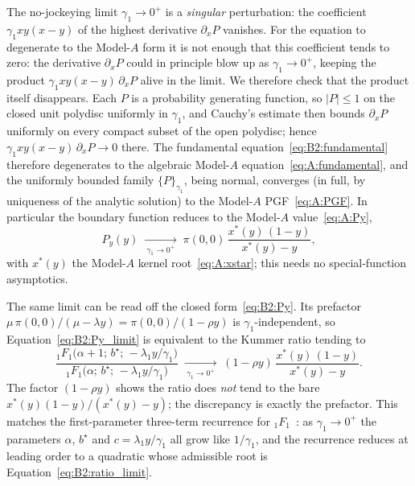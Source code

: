 \begin{remark}\label{rem:B2:singular_limit}
The no-jockeying limit $\gamma_1\to0^{+}$ is a \emph{singular} perturbation: the coefficient
$\gamma_1 xy(x-y)$ of the highest derivative $\partial_x P$ vanishes. For the equation to
degenerate to the Model-$A$ form it is not enough that this coefficient tends to zero: the
derivative $\partial_x P$ could in principle blow up as $\gamma_1\to0^{+}$, keeping the
product $\gamma_1 xy(x-y)\,\partial_x P$ alive in the limit. We therefore check that the
product itself disappears. Each $P$ is a
probability generating function, so $|P|\le1$ on the closed unit polydisc uniformly in
$\gamma_1$, and Cauchy's estimate then bounds $\partial_x P$ uniformly on every compact subset
of the open polydisc; hence $\gamma_1 xy(x-y)\,\partial_x P\to0$ there. The fundamental
equation~\eqref{eq:B2:fundamental} therefore degenerates to the algebraic Model-$A$
equation~\eqref{eq:A:fundamental}, and the uniformly bounded family $\{P\}_{\gamma_1}$, being
normal, converges (in full, by uniqueness of the analytic solution) to the Model-$A$
PGF~\eqref{eq:A:PGF}. In particular the boundary function reduces to the Model-$A$
value~\eqref{eq:A:Py},
\begin{equation}
    P_y(y)\;\xrightarrow[\ \gamma_1\to0^{+}\ ]{}\;
    \pi(0,0)\,\frac{x^*(y)\,(1-y)}{x^*(y)-y},
    \label{eq:B2:Py_limit}
\end{equation}
with $x^*(y)$ the Model-$A$ kernel root~\eqref{eq:A:xstar}; this needs no special-function
asymptotics.

The same limit can be read off the closed form~\eqref{eq:B2:Py}. Its prefactor
$\mu\,\pi(0,0)/(\mu-\lambda y)=\pi(0,0)/(1-\rho y)$ is $\gamma_1$-independent,
so Equation~\eqref{eq:B2:Py_limit} is equivalent to the Kummer ratio tending to
\begin{equation}
    \frac{{}_1F_1\!\bigl(\alpha+1;\,b^\star;\,-\lambda_1 y/\gamma_1\bigr)}
         {{}_1F_1\!\bigl(\alpha;\,b^\star;\,-\lambda_1 y/\gamma_1\bigr)}
    \;\xrightarrow[\ \gamma_1\to0^{+}\ ]{}\;
    (1-\rho y)\,\frac{x^*(y)\,(1-y)}{x^*(y)-y}.
    \label{eq:B2:ratio_limit}
\end{equation}
The factor $(1-\rho y)$ shows the ratio does \emph{not} tend to the bare
$x^*(y)(1-y)/(x^*(y)-y)$; the discrepancy is exactly the prefactor. This matches the
first-parameter three-term recurrence for ${}_1F_1$~\cite[\S13.3]{dlmf}: as $\gamma_1\to0^{+}$
the parameters $\alpha$, $b^\star$ and $c=\lambda_1 y/\gamma_1$ all grow like $1/\gamma_1$, and
the recurrence reduces at leading order to a quadratic whose admissible root
is Equation~\eqref{eq:B2:ratio_limit}.
\end{remark}

